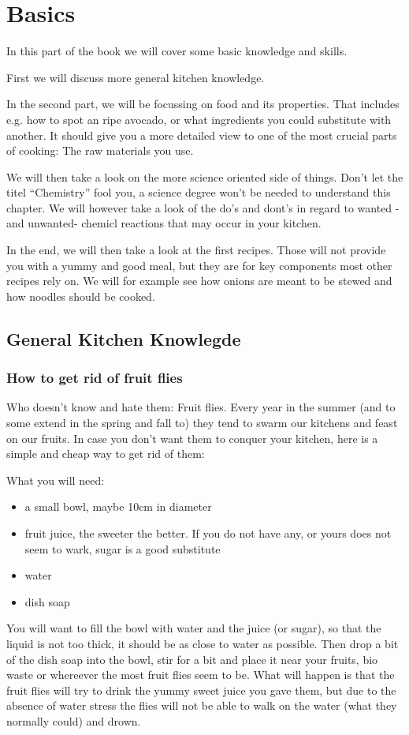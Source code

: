 \chapter{Basics}

In this part of the book we will cover some basic knowledge and skills.

First we will discuss more general kitchen knowledge. %

In the second part, we will be focussing on food and its properties. That includes e.g. how to spot an ripe avocado, or what ingredients you could substitute with another. It should give you a more detailed view to one of the most crucial parts of cooking: The raw materials you use.

We will then take a look on the more science oriented side of things. Don't let the titel ``Chemistry'' fool you, a science degree won't be needed to understand this chapter. We will however take a look of the do's and dont's in regard to wanted -and unwanted- chemicl reactions that may occur in your kitchen.

In the end, we will then take a look at the first recipes. Those will not  provide you with a yummy and good meal, but they are for key components most other recipes rely on. We will for example see how onions are meant to be stewed and how noodles should be cooked.
\clearpage
\section{General Kitchen Knowlegde}

\subsection{How to get rid of fruit flies}

Who doesn't know and hate them: Fruit flies. Every year in the summer (and to some extend in the spring and fall to) they tend to swarm our kitchens and feast on our fruits. In case you don't want them to conquer your kitchen, here is a simple and cheap way to get rid of them:

What you will need:
\begin{itemize}
	\item a small bowl, maybe 10cm in diameter
	\item fruit juice, the sweeter the better. If you do not have any, or yours does not seem to wark, sugar is a good substitute
	\item water
	\item dish soap
\end{itemize}
You will want to fill the bowl with water and the juice (or sugar), so that the liquid is not too thick, it should be as close to water as possible. Then drop a bit of the dish soap into the bowl, stir for a bit and place it near your fruits, bio waste or whereever the most fruit flies seem to be. What will happen is that the fruit flies will try to drink the yummy sweet juice you gave them, but due to the absence of water stress the flies will not be able to walk on the water (what they normally could) and drown.


